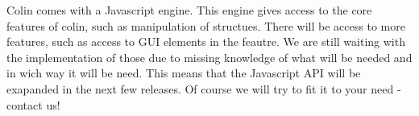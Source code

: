 Colin comes with a Javascript engine. This engine gives access to the core features of colin, such as manipulation of structues. There will be access to more features, such as access to GUI elements in the feautre. We are still waiting with the implementation of those due to missing knowledge of what will be needed and in wich way it will be need. This means that the Javascript API will be exapanded in the next few releases. Of course we will try to fit it to your need - contact us!

